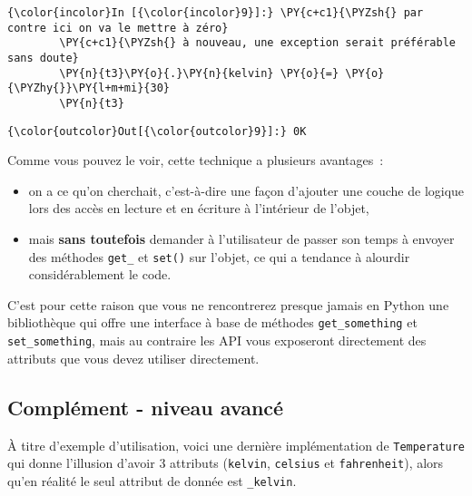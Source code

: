     \begin{Verbatim}[commandchars=\\\{\},frame=single,framerule=0.3mm,rulecolor=\color{cellframecolor}]
{\color{incolor}In [{\color{incolor}9}]:} \PY{c+c1}{\PYZsh{} par contre ici on va le mettre à zéro}
        \PY{c+c1}{\PYZsh{} à nouveau, une exception serait préférable sans doute}
        \PY{n}{t3}\PY{o}{.}\PY{n}{kelvin} \PY{o}{=} \PY{o}{\PYZhy{}}\PY{l+m+mi}{30}
        \PY{n}{t3}
\end{Verbatim}


\begin{Verbatim}[commandchars=\\\{\},frame=single,framerule=0.3mm,rulecolor=\color{cellframecolor}]
{\color{outcolor}Out[{\color{outcolor}9}]:} 0K
\end{Verbatim}
            
    Comme vous pouvez le voir, cette technique a plusieurs avantages~:

\begin{itemize}
\tightlist
\item
  on a ce qu'on cherchait, c'est-à-dire une façon d'ajouter une couche
  de logique lors des accès en lecture et en écriture à l'intérieur de
  l'objet,
\item
  mais \textbf{sans toutefois} demander à l'utilisateur de passer son
  temps à envoyer des méthodes \texttt{get\_} et \texttt{set()} sur
  l'objet, ce qui a tendance à alourdir considérablement le code.
\end{itemize}

C'est pour cette raison que vous ne rencontrerez presque jamais en
Python une bibliothèque qui offre une interface à base de méthodes
\texttt{get\_something} et \texttt{set\_something}, mais au contraire
les API vous exposeront directement des attributs que vous devez
utiliser directement.

    \hypertarget{compluxe9ment---niveau-avancuxe9}{%
\subsection{Complément - niveau
avancé}\label{compluxe9ment---niveau-avancuxe9}}

    À titre d'exemple d'utilisation, voici une dernière implémentation de
\texttt{Temperature} qui donne l'illusion d'avoir 3 attributs
(\texttt{kelvin}, \texttt{celsius} et \texttt{fahrenheit}), alors qu'en
réalité le seul attribut de donnée est \texttt{\_kelvin}.

